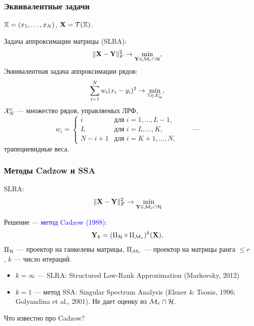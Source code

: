 \documentclass[unicode, notheorems]{beamer}
\begin{document}
\begin{frame}
	\frametitle{Эквивалентные задачи}
	\vspace{-0.2cm}
	$\mathbb{X} = (x_1, \ldots, x_N)$, $\mathbf{X} = \mathcal{T}(\mathbb{X})$. 
	
	Задача аппроксимации матрицы (SLRA):
	\begin{equation*} \label{matrixtask}
	\|\mathbf{X} - \mathbf{Y}\|^2_F \to \min_{\substack{\mathbf{Y} \in \mathcal{M}_r \cap \mathcal{H}}},
	\end{equation*}
	\vspace{0.2cm}
	Эквивалентная задача аппроксимации рядов:
	\begin{equation*}
	\sum \limits_{i=1}^N w_i(x_i - y_i)^2 \to \min_{\mathbb{Y} \in \mathcal{X}_N^r},
	\end{equation*}
	$\mathcal{X}_N^r$ --- множество рядов, управляемых ЛРФ,
	\begin{equation*}
	w_i = \begin{cases}
	i & \text{для $i = 1, \ldots, L-1,$}\\
	L & \text{для $i = L, \ldots, K,$}\\
	N - i + 1 & \text{для $i = K + 1, \ldots, N,$}
	\end{cases} \qquad \text{---}
	\end{equation*}
	трапециевидные веса.
\end{frame}

\begin{frame}
	\frametitle{Методы Cadzow и SSA}
	
	SLRA:
	\begin{equation*}
		\|\mathbf{X} - \mathbf{Y}\|^2_F \to \min_{\substack{\mathbf{Y} \in \mathcal{M}_r \cap \mathcal{H}}}
	\end{equation*}

	Решение --- \textcolor{blue}{метод Cadzow (1988)}: 
	\begin{equation*}
	\mathbf{Y}_k = (\Pi_{\mathcal{H}} \circ \Pi_{\mathcal{M}_r})^k (\mathbf{X}),
	\end{equation*}
	$\Pi_{\mathcal{H}}$ --- проектор на ганкелевы матрицы, $\Pi_{\mathcal{M}_r}$ --- проектор на матрицы ранга $\le r$, $k$ --- число итераций.
	
	\begin{itemize}
		\item $k = \infty$ --- SLRA: Structured Low-Rank Approximation (Markovsky, 2012)
		\item $k = 1$ --- метод SSA: Singular Spectrum Analysis (Elsner \& Tsonis, 1996; Golyandina et al., 2001). Не дает оценку из $\mathcal{M}_r \cap \mathcal{H}$.
	\end{itemize}
	
	\vspace{0.4cm}\pause		
	Что известно про Cadzow?
\end{frame}
\end{document}
